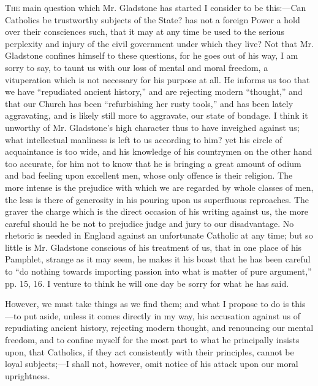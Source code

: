 T\textsc{he} main question which Mr. Gladstone has started I consider to
be this:—Can Catholics be trustworthy subjects of the State? has not a
foreign Power a hold over their consciences such, that it may at any
time be used to the serious perplexity and injury of the civil
government under which they live? Not that Mr. Gladstone confines
himself to these questions, for he goes out of his way, I am sorry to
say, to taunt us with our loss of mental and moral freedom, a
vituperation which is not necessary for his purpose at all. He informs
us too that we have ``repudiated ancient history,'' and are
rejecting modern ``thought,'' and that our Church has been
``refurbishing her rusty tools,'' and has been lately
aggravating, and is likely still more to aggravate, our state of
bondage. I think it unworthy of Mr. Gladstone's high character thus to
have inveighed against us; what intellectual manliness is left to us
according to him? yet his circle of acquaintance is too wide, and his
knowledge of his countrymen on the other hand too accurate, for him not
to know that he is bringing a great amount of odium and bad feeling upon
excellent men, whose only offence is their religion. The more intense is the prejudice with which we are regarded by whole classes of
men, the less is there of generosity in his pouring upon us superfluous
reproaches. The graver the charge which is the direct occasion of his
writing against us, the more careful should he be not to prejudice judge
and jury to our disadvantage. No rhetoric is needed in England against
an unfortunate Catholic at any time; but so little is Mr. Gladstone
conscious of his treatment of us, that in one place of his Pamphlet,
strange as it may seem, he makes it his boast that he has been careful
to ``do nothing towards importing passion into what is matter of
pure argument,'' pp. 15, 16. I venture to think he will one day be
sorry for what he has said.

However, we must take things as we find them; and what I propose to
do is this—to put aside, unless it comes directly in my way, his
accusation against us of repudiating ancient history, rejecting modern
thought, and renouncing our mental freedom, and to confine myself for
the most part to what he principally insists upon, that Catholics, if
they act consistently with their principles, cannot be loyal subjects;—I
shall not, however, omit notice of his attack upon our moral
uprightness.

